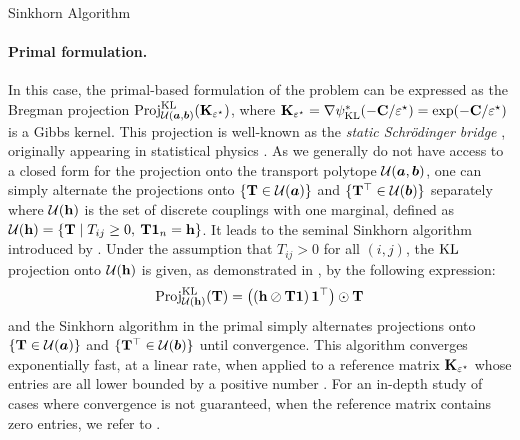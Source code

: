 \begin{mem1}{Sinkhorn Algorithm}
    \paragraph{Primal formulation.}
    In this case, the primal-based formulation of the problem can be expressed as the Bregman projection $\operatorname{Proj}^{\operatorname{KL}}_{{\mathcal{U}}(\bm{a}, \bm{b})}({\mathbf{K}}_{\varepsilon^\star})$, where ${\mathbf{K}}_{\varepsilon^\star} = \nabla \psi_{\operatorname{KL}}^{*}(-{\mathbf{C}} / \varepsilon^\star) = \exp(-{\mathbf{C}} / \varepsilon^\star)$ is a Gibbs kernel. This projection is well-known as the \emph{static Schrödinger bridge} \citep{leonard2013survey}, originally appearing in statistical physics \citep{schrodinger1931umkehrung}.  As we generally do not have access to a closed form for the projection onto the transport polytope ${\mathcal{U}}(\bm{a}, \bm{b})$, one can simply alternate the projections onto $\{ {\mathbf{T}} \in {\mathcal{U}}(\bm{a}) \}$ and $\{ {\mathbf{T}}^\top \in {\mathcal{U}}(\bm{b}) \}$ separately where ${\mathcal{U}}({\mathbf{h}})$ is the set of discrete couplings with one marginal, defined as ${\mathcal{U}}({\mathbf{h}}) = \left\{{\mathbf{T}} \mid T_{ij} \geq 0, \: {\mathbf{T}} \mathbf{1}_n = {\mathbf{h}} \right\}$. It leads to the seminal Sinkhorn algorithm introduced by \cite{cuturi2013sinkhorn}.
    Under the assumption that $T_{ij} > 0$ for all $(i, j)$, the $\operatorname{KL}$ projection onto ${\mathcal{U}}({\mathbf{h}})$ is given, as demonstrated in \citep{cuturi2013sinkhorn}, by the following expression:
    \begin{align}
        \operatorname{Proj}^{\operatorname{KL}}_{{\mathcal{U}}({\mathbf{h}})}({\mathbf{T}}) = \left(\left({\mathbf{h}} \oslash {\mathbf{T}} \bm{1}  \right) \bm{1}^\top \right) \odot {\mathbf{T}}
    \end{align}
    and the Sinkhorn algorithm in the primal simply alternates projections onto $\{ {\mathbf{T}} \in {\mathcal{U}}(\bm{a}) \}$ and $\{ {\mathbf{T}}^\top \in {\mathcal{U}}(\bm{b}) \}$ until convergence. This algorithm converges exponentially fast, \ie at a linear rate, when applied to a reference matrix ${\mathbf{K}}_{\varepsilon^\star}$ whose entries are all lower bounded by a positive number \citep{sinkhorn1967concerning}. For an in-depth study of cases where convergence is not guaranteed, \ie when the reference matrix contains zero entries, we refer to \citep{baradat2022convergence}.


\end{mem1}
